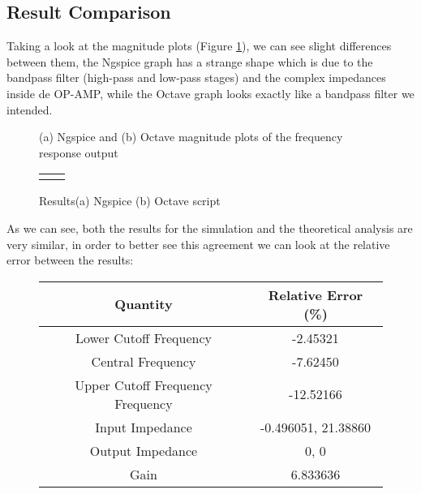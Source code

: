 \subsection{Result Comparison}
\hspace{12pt} Taking a look at the magnitude plots (Figure \ref{fig:mag_comp}), we can see slight differences between them, the Ngspice graph has a strange shape which is due to the bandpass filter (high-pass and low-pass stages) and the complex impedances inside de OP-AMP, while the Octave graph looks exactly like a bandpass filter we intended.

\begin{figure}[h!]
	\centering
	\caption{(a) Ngspice and (b) Octave magnitude plots of the frequency response output}
	\label{fig:mag_comp}
\end{figure}

\begin{figure}[h]
	\centering
	\begin{minipage}[t]{.4\textwidth}
		\centering
		\small
		\begin{tabular}{|c|c|}
		\hline
		
		\normalsize
		\end{tabular}
	\end{minipage}
	\medskip
	\begin{minipage}{.4\textwidth}
		\centering
       	
	\end{minipage}
	\label{fig:op_comp}
	\caption{Results(a) Ngspice (b) Octave script}
\end{figure}

As we can see, both the results for the simulation and the theoretical analysis are very similar, in order to better see this agreement we can look at the relative error between the results:

\begin{figure}[h]
	\centering
	\begin{tabular}{|c|c|}
		\hline
		Quantity & Relative Error (\%) \\ \hline
		Lower Cutoff Frequency & -2.45321 \\ \hline
		Central Frequency & -7.62450 \\ \hline
		Upper Cutoff Frequency Frequency & -12.52166 \\ \hline
		Input Impedance & -0.496051, 21.38860\\ \hline
		Output Impedance & 0, 0\\ \hline
		Gain & 6.833636 \\ \hline
	\end{tabular}
\end{figure}

